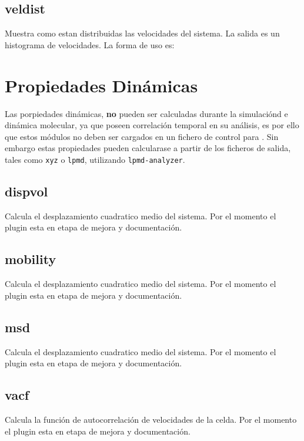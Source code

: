\subsection{veldist}
Muestra como estan distribuidas las velocidades del sistema. La salida es un histograma de velocidades. La forma de uso es:


\section{Propiedades Din\'amicas}
Las porpiedades din\'amicas, \textbf{no} pueden ser calculadas durante la simulaci\'ond e din\'amica molecular, ya que poseen correlaci\'on temporal en su an\'alisis, es por ello que estos m\'odulos no deben ser cargados en un fichero de control para {\lpmd}. Sin embargo estas propiedades pueden calcularase a partir de los ficheros de salida, tales como \verb|xyz| o \verb|lpmd|, utilizando \verb|lpmd-analyzer|.
\subsection{dispvol}
Calcula el desplazamiento cuadratico medio del sistema. Por el momento el plugin esta en etapa de mejora y documentaci\'on.
\subsection{mobility}
Calcula el desplazamiento cuadratico medio del sistema. Por el momento el plugin esta en etapa de mejora y documentaci\'on.
\subsection{msd}
Calcula el desplazamiento cuadratico medio del sistema. Por el momento el plugin esta en etapa de mejora y documentaci\'on.
\subsection{vacf}
Calcula la funci\'on de autocorrelaci\'on de velocidades de la celda. Por el momento el plugin esta en etapa de mejora y documentaci\'on.


